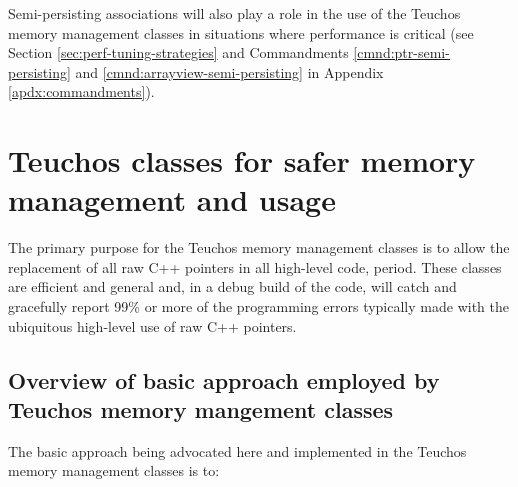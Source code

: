 \documentclass[pdf,ps2pdf,11pt]{SANDreport}
\begin{document}
Semi-persisting associations will also play a role in the use of the
Teuchos memory management classes in situations where performance is
critical (see Section {}\ref{sec:perf-tuning-strategies} and
Commandments {}\ref{cmnd:ptr-semi-persisting} and
{}\ref{cmnd:arrayview-semi-persisting} in Appendix
{}\ref{apdx:commandments}).


%
{}\section{Teuchos classes for safer memory management and usage}
\label{sec:teuchos-mem-mng-classes}
%

The primary purpose for the Teuchos memory management classes is to
allow the replacement of all raw C++ pointers in all high-level code,
period.  These classes are efficient and general and, in a debug build
of the code, will catch and gracefully report 99\% or more of the
programming errors typically made with the ubiquitous high-level use
of raw C++ pointers.


%
{}\subsection{Overview of basic approach employed by Teuchos
memory mangement classes}
\label{sec:overview_of_basic_approach}
%

The basic approach being advocated here and implemented in the Teuchos
memory management classes is to:
\end{document}
